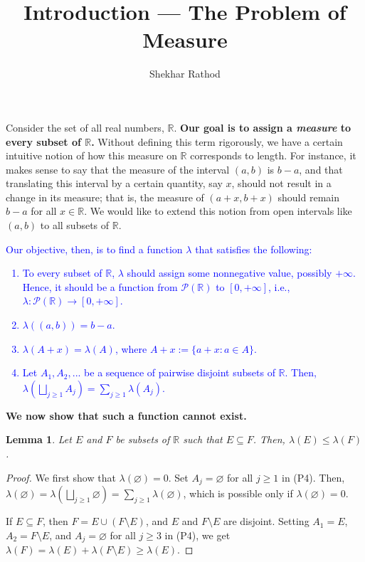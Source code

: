 \documentclass[12pt]{extarticle}
\title{Introduction --- The Problem of Measure}
\author{Shekhar Rathod}
\date{}
\newcommand{\R}{\mathbb{R}}
\newcommand{\Po}{\mathscr{P}}
\newcommand{\sub}{\subseteq}
\newcommand{\sm}{\setminus}
\newtheorem*{lemma}{Lemma}
\begin{document}
\maketitle

\noindent
Consider the set of all real numbers, $\R$. \textbf{Our goal is to assign a \textit{measure} to every subset of $\R$.} Without defining this term rigorously, we have a certain intuitive notion of how this measure on $\R$ corresponds to length. For instance, it makes sense to say that the measure of the interval $(a, b)$ is $b - a$, and that translating this interval by a certain quantity, say $x$, should not result in a change in its measure; that is, the measure of $(a + x, b + x)$ should remain $b - a$ for all $x \in \R$. We would like to extend this notion from open intervals like $(a, b)$ to all subsets of $\R$. 


\textcolor{blue}{
Our objective, then, is to find a function $\lambda$ that satisfies the following:
\begin{enumerate}[label=(P\arabic*)]
    \item To every subset of $\R$, $\lambda$ should assign some nonnegative value, possibly $+\infty$. Hence, it should be a function from $\Po(\R)$ to $[0, +\infty]$, i.e., $\lambda: \Po(\R) \to [0, +\infty]$.    
    \item $\lambda((a, b)) = b - a$.    
    \item $\lambda(A + x) = \lambda(A)$, where $A + x := \{ a + x : a \in A \}$.    
    \item Let $A_1, A_2,...$ be a sequence of pairwise disjoint subsets of $\R$. Then, $\lambda(\bigsqcup_{j \geq 1} A_j) = \sum_{j \geq 1} \lambda(A_j)$.
\end{enumerate}}

\textbf{We now show that such a function cannot exist.}


\begin{lemma}
Let $E$ and $F$ be subsets of $\R$ such that $E \sub F$. Then, $\lambda(E) \leq \lambda(F)$.
\end{lemma}

\begin{proof}
We first show that $\lambda(\varnothing) = 0$. Set $A_j = \varnothing$ for all $j \geq 1$ in (P4). Then, $\lambda(\varnothing) = \lambda \left( \bigsqcup_{j \geq 1} \varnothing \right) = \sum_{j \geq 1} \lambda(\varnothing)$, which is possible only if $\lambda(\varnothing) = 0$.

If $E \sub F$, then $F = E \cup (F \sm E)$, and $E$ and $F \sm E$ are disjoint. Setting $A_1 = E$, $A_2 = F \sm E$, and $A_j = \varnothing$ for all $j \geq 3$ in (P4), we get $\lambda(F) = \lambda(E) + \lambda(F \sm E) \geq \lambda(E)$.
\end{proof}
\end{document}
